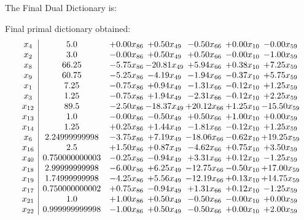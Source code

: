 \documentclass[8pt]{article}
\begin{document}
The Final Dual Dictionary is: 

 Final primal dictionary obtained: 
\[\begin{array}{c| c c@{\hskip 2pt} c@{\hskip 2pt} c@{\hskip 2pt} c@{\hskip 2pt} c@{\hskip 2pt} }
 x_{4}   &  5.0 & +  0.00 x_{86} & +  0.50 x_{49} & -0.50 x_{66} & +  0.00 x_{10} & -0.00 x_{59}\\
 x_{2}   &  3.0 & -0.00 x_{86} & +  0.50 x_{49} & +  0.50 x_{66} & -0.00 x_{10} & -1.00 x_{59}\\
 x_{8}   &  66.25 & -5.75 x_{86} & -20.81 x_{49} & +  5.94 x_{66} & +  0.38 x_{10} & +  7.25 x_{59}\\
 x_{9}   &  60.75 & -5.25 x_{86} & -4.19 x_{49} & -1.94 x_{66} & -0.37 x_{10} & +  5.75 x_{59}\\
 x_{1}   &  7.25 & -0.75 x_{86} & +  0.94 x_{49} & -1.31 x_{66} & -0.12 x_{10} & +  1.25 x_{59}\\
 x_{3}   &  1.25 & -0.75 x_{86} & +  1.94 x_{49} & -2.31 x_{66} & -0.12 x_{10} & +  2.25 x_{59}\\
 x_{12}   &  89.5 & -2.50 x_{86} & -18.37 x_{49} & + 20.12 x_{66} & +  1.25 x_{10} & -15.50 x_{59}\\
 x_{13}   &  1.0 & -0.00 x_{86} & -0.50 x_{49} & +  0.50 x_{66} & +  1.00 x_{10} & +  0.00 x_{59}\\
 x_{14}   &  1.25 & +  0.25 x_{86} & +  1.44 x_{49} & -1.81 x_{66} & -0.12 x_{10} & +  1.25 x_{59}\\
 x_{6}   &  2.24999999998 & -3.75 x_{86} & +  7.19 x_{49} & -18.06 x_{66} & -0.62 x_{10} & + 19.25 x_{59}\\
 x_{16}   &  2.5 & +  1.50 x_{86} & +  0.87 x_{49} & -4.62 x_{66} & +  0.75 x_{10} & +  3.50 x_{59}\\
 x_{40}   &  0.750000000003 & -0.25 x_{86} & -0.94 x_{49} & +  3.31 x_{66} & +  0.12 x_{10} & -1.25 x_{59}\\
 x_{18}   &  2.99999999998 & -6.00 x_{86} & +  6.25 x_{49} & -12.75 x_{66} & -0.50 x_{10} & + 17.00 x_{59}\\
 x_{19}   &  1.74999999998 & -4.25 x_{86} & +  5.56 x_{49} & -12.19 x_{66} & +  0.13 x_{10} & + 14.75 x_{59}\\
 x_{17}   &  0.750000000002 & +  0.75 x_{86} & -0.94 x_{49} & +  1.31 x_{66} & +  0.12 x_{10} & -1.25 x_{59}\\
 x_{21}   &  1.0 & +  1.00 x_{86} & +  0.50 x_{49} & -0.50 x_{66} & -0.00 x_{10} & +  0.00 x_{59}\\
 x_{22}   &  0.999999999998 & -1.00 x_{86} & +  0.50 x_{49} & -0.50 x_{66} & +  0.00 x_{10} & +  2.00 x_{59}\\

\end{array}\]
\end{document}
